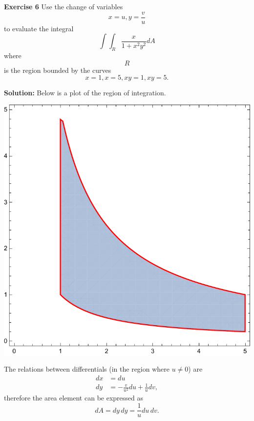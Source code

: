 \documentclass[12pt,oneside]{exam}
\newenvironment{exercise}[1]{\vspace{.1in}\noindent\textbf{Exercise #1 \hspace{.05em}}}{}
\newenvironment{newsolution}{\vspace{.1in}\noindent\textbf{Solution: \hspace{.05em}}}{}
\begin{document}
\begin{exercise}{6}
Use the change of variables 
\begin{equation*}
x =u, y = \frac{v}{u}
\end{equation*}
to evaluate the integral 
\begin{equation*}
\int\int_{R} \frac{x}{1+x^2y^2} dA
\end{equation*}
where $$R$$ is the region bounded by the curves 
\begin{equation*}
x=1, x=5, xy=1, xy=5.
\end{equation*}
\end{exercise}

\begin{newsolution}
Below is a plot of the region of integration.
\begin{center}
\includegraphics[scale=0.5]{p14.pdf}
\end{center}
The relations between differentials (in the region where $ u \neq 0$) are
\begin{align*}
dx & = du \\
dy & = -\frac{v}{u^2} du + \frac{1}{u} dv,
\end{align*}
therefore the area element can be expressed as 
\begin{equation*}
dA = dy \, dy = \frac{1}{u} du \, dv.
\end{equation*}

\end{newsolution}
\end{document}
